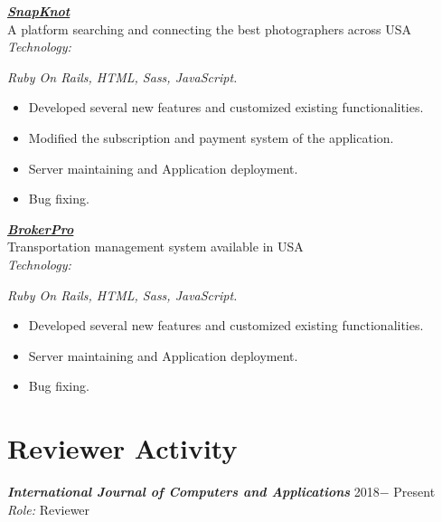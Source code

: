 \documentclass[11pt, a4paper]{awesome-cv}
\begin{document}
{{{{{{{{{{{
{\sl \textbf{\href{https://snapknot.com/}{SnapKnot} }}   \\
A platform searching and connecting the best photographers across USA \\
{\sl Technology:} {\sl Ruby On Rails, HTML, Sass, JavaScript.
		\vspace*{-.6em}
	\begin{itemize}
		\item  Developed several new features and customized existing functionalities.
		\vspace*{-.5em}
		\item Modified the subscription and payment system of the application. 
		\vspace*{-.5em}
		\item Server maintaining and Application deployment. 
		\vspace*{-.5em}
		\item  Bug fixing.
	\end{itemize}


{\sl \textbf{\href{https://brokerpro.com/}{BrokerPro} }}   \\
Transportation management system available in USA\\
{\sl Technology:} {\sl Ruby On Rails, HTML, Sass, JavaScript.	
		\vspace*{-.6em}	
  	\begin{itemize}
  	\item  Developed several new features and customized existing functionalities.
  	\vspace*{-.5em}
  	\item Server maintaining and Application deployment. 
  	\vspace*{-.5em}
  	\item  Bug fixing.
  \end{itemize}
  
\vspace{-18pt}
\section*{Reviewer Activity}
\vspace{-20pt}
\noindent\makebox[\linewidth]{\rule{500pt}{1.8pt}}  
  
{\sl \textbf{International Journal of Computers and Applications }} \hfill   2018$-$ Present\\
{\sl Role:} Reviewer  \\

}}}}}}}}}}}}}
\end{document}
